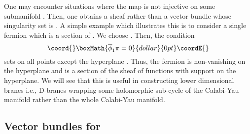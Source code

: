 \documentclass[a4paper,12pt]{article}
\begin{document}
One may encounter situations where the map \coordHE{} is not injective on
some submanifold \myHighlight{$\Sigma$}\coordHE{}. Then, one obtains a sheaf rather than a vector bundle
whose singularity set is \myHighlight{$\Sigma$}\coordHE{}. A simple example which illustrates
this is to consider a single fermion which is a section of \coordHE{}.
We choose \coordHE{}. Then, the condition
$$\coord{}\boxMath{
\overline{\phi}_1 \pi =0
}{dollar}{0pt}\coordE{}$$
sets \coordHE{} on all points except the hyperplane \coordHE{}. Thus, the
fermion \myHighlight{$\pi$}\coordHE{} is non-vanishing on the hyperplane and is a section
of the sheaf of functions with support on the hyperplane. We will see
that this is useful in constructing lower dimensional branes i.e.,
D-branes wrapping some holomorphic sub-cycle of the Calabi-Yau manifold
rather than the whole Calabi-Yau manifold.





\subsection{Vector bundles for \coordHE{}}
\label{secvbpn}
\end{document}
